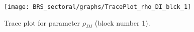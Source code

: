 \begin{figure}[H]
\centering
  \texttt{[image: BRS\_sectoral/graphs/TracePlot\_rho\_DI\_blck\_1]}\\
    \caption{Trace plot for parameter ${\rho_{DI}}$ (block number 1).}
\end{figure}
